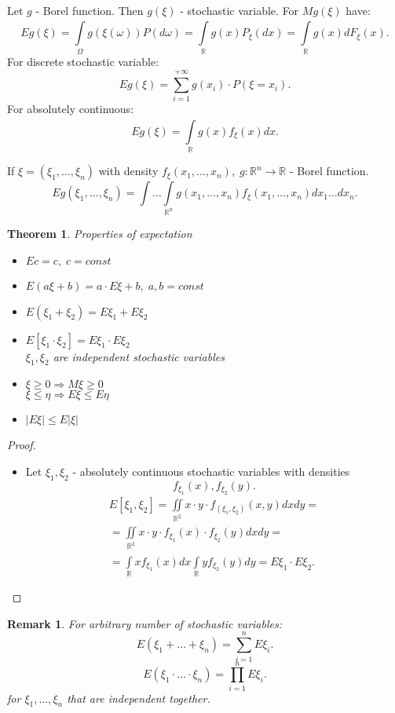 \documentclass[12pt,letterpaper]{report}
\newtheorem{theorem}{Theorem}
\newtheorem*{remark}{Remark}
\begin{document}
Let $g$ - Borel function. Then $g(\xi)$ - stochastic variable. For $Mg(\xi)$ have:
\[
    Eg(\xi) = \int\limits_{\Omega}^{} g(\xi(\omega)) P(d\omega) = \int\limits_{\mathbb{R}}^{} g(x) P_{\xi} (dx) = \int\limits_{\mathbb{R}}^{} g(x) dF_{\xi} (x) 
.\] 
For discrete stochastic variable:
\[
    Eg(\xi) = \sum_{i=1}^{+\infty} g(x_i) \cdot P(\xi = x_i)
.\] 
For absolutely continuous:
\[
    Eg(\xi) = \int\limits_{\mathbb{R}}^{} g(x) f_{\xi}(x)dx
.\] 

If $\xi = (\xi_1, \dots, \xi_n)$ with density $f_{\xi}(x_1, \dots, x_n), \; g : \mathbb{R}^{n} \to \mathbb{R} $ - Borel function.
\[
    Eg(\xi_1, \dots, \xi_n) = \int \dots \int\limits_{\mathbb{R}^n} g(x_1, \dots, x_n) f_{\xi}(x_1, \dots, x_n) dx_1 \dots dx_n
.\] 

\begin{theorem} Properties of expectation \\

    \begin{itemize}
        \item[1.] $ Ec = c, \; c = const $
    \item[2.] $ E(a\xi + b) = a \cdot E\xi + b, \; a,b = const $
    \item[3.] $ E(\xi_1 + \xi_2) = E\xi_1 + E\xi_2 $
    \item[4.] $ E[\xi_1 \cdot \xi_2] = E\xi_1 \cdot E\xi_2 $ \\
        $\xi_1, \xi_2$ are independent stochastic variables 
    \item[5.] $\xi \geq 0 \Rightarrow M\xi \geq 0$ \\
        $ \xi \leq \eta \Rightarrow E\xi \leq E\eta $
    \item [6.] $ |E\xi| \leq E|\xi| $
    \end{itemize}
\end{theorem}
\begin{proof}
    \begin{itemize}
        \item[4.] Let $\xi_1, \xi_2$ - absolutely continuous stochastic variables with densities
            \[
                f_{\xi_1}(x), f_{\xi_2}(y)
            .\] 
            \begin{align*}
                E[\xi_1, \xi_2] = \iint\limits_{\mathbb{R}^2} x \cdot y \cdot f_{(\xi_1,\xi_2)}(x,y)dx dy = \\
                = \iint\limits_{\mathbb{R}^2} x \cdot y \cdot f_{\xi_1}(x) \cdot f_{\xi_2}(y) dx dy = \\
                = \int\limits_{\mathbb{R}}^{} x f_{\xi_1}(x)dx \int\limits_{\mathbb{R}}^{} y f_{\xi_2}(y) dy = E\xi_1 \cdot E\xi_2
            .\end{align*}
    \end{itemize}
\end{proof}
\begin{remark}
    For arbitrary number of stochastic variables:
    \[
        E(\xi_1 + \dots + \xi_n) = \sum_{i=1}^{n} E\xi_i
    .\] 
    \[
        E(\xi_1 \cdot \dots \cdot \xi_n) = \prod_{i=1}^{n} E\xi_i 
    .\] 
    for $\xi_1, \dots, \xi_n$ that are independent together.
\end{remark}
\end{document}
